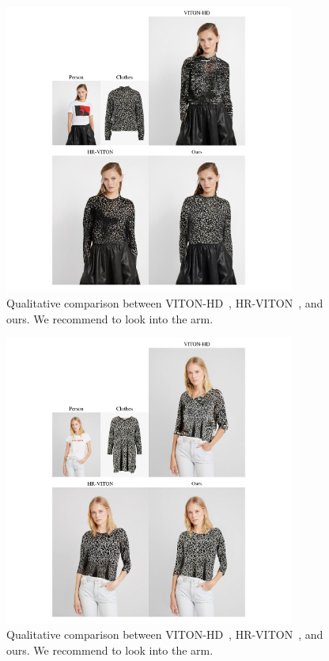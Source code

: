 \begin{figure}[t!]
    \centering
     \includegraphics[width=0.85\textwidth]{fig_supp/fig_suppl_HD_2.pdf}
     \caption{Qualitative comparison between VITON-HD~\cite{choi2021viton}, HR-VITON~\cite{lee2022hrviton}, and ours. We recommend to look into the arm.
     }
     \label{fig_supp_longsleeve_HR_1}
\end{figure}

\begin{figure}[t!]
    \centering
     \includegraphics[width=0.85\textwidth]{fig_supp/fig_suppl_HD_1.pdf}
     \caption{Qualitative comparison between VITON-HD~\cite{choi2021viton}, HR-VITON~\cite{lee2022hrviton}, and ours. We recommend to look into the arm.
     }
     \label{fig_supp_longsleeve_HR_2}
\end{figure}

